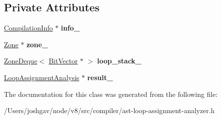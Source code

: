 \subsection*{Private Attributes}
\begin{DoxyCompactItemize}
\item 
\hyperlink{classv8_1_1internal_1_1_compilation_info}{Compilation\+Info} $\ast$ {\bfseries info\+\_\+}\hypertarget{classv8_1_1internal_1_1compiler_1_1_ast_loop_assignment_analyzer_aecb5385f933182ffbfc1a200c08f8b2a}{}\label{classv8_1_1internal_1_1compiler_1_1_ast_loop_assignment_analyzer_aecb5385f933182ffbfc1a200c08f8b2a}

\item 
\hyperlink{classv8_1_1internal_1_1_zone}{Zone} $\ast$ {\bfseries zone\+\_\+}\hypertarget{classv8_1_1internal_1_1compiler_1_1_ast_loop_assignment_analyzer_a044bbc4fa41f9152fb94aff11b365b41}{}\label{classv8_1_1internal_1_1compiler_1_1_ast_loop_assignment_analyzer_a044bbc4fa41f9152fb94aff11b365b41}

\item 
\hyperlink{classv8_1_1internal_1_1_zone_deque}{Zone\+Deque}$<$ \hyperlink{classv8_1_1internal_1_1_bit_vector}{Bit\+Vector} $\ast$ $>$ {\bfseries loop\+\_\+stack\+\_\+}\hypertarget{classv8_1_1internal_1_1compiler_1_1_ast_loop_assignment_analyzer_a8e8f7dc2a61789c5ed2304e8e84de0c7}{}\label{classv8_1_1internal_1_1compiler_1_1_ast_loop_assignment_analyzer_a8e8f7dc2a61789c5ed2304e8e84de0c7}

\item 
\hyperlink{classv8_1_1internal_1_1compiler_1_1_loop_assignment_analysis}{Loop\+Assignment\+Analysis} $\ast$ {\bfseries result\+\_\+}\hypertarget{classv8_1_1internal_1_1compiler_1_1_ast_loop_assignment_analyzer_a2bf3ca934327069aea0d5893b0341fe9}{}\label{classv8_1_1internal_1_1compiler_1_1_ast_loop_assignment_analyzer_a2bf3ca934327069aea0d5893b0341fe9}

\end{DoxyCompactItemize}


The documentation for this class was generated from the following file\+:\begin{DoxyCompactItemize}
\item 
/\+Users/joshgav/node/v8/src/compiler/ast-\/loop-\/assignment-\/analyzer.\+h\end{DoxyCompactItemize}
